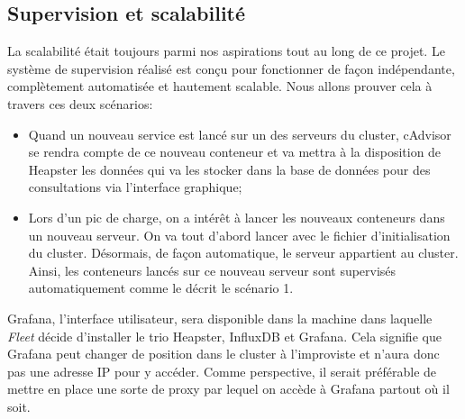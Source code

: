 \begin{onehalfspace}
\subsection{Supervision et scalabilité}

La scalabilité était toujours parmi nos aspirations tout au long de ce projet. Le système de supervision réalisé est conçu pour fonctionner de façon indépendante, complètement automatisée et hautement scalable. Nous allons prouver cela à travers ces deux scénarios:

\begin{itemize}
	\item Quand un nouveau service est lancé sur un des serveurs du cluster, cAdvisor se rendra compte de ce nouveau conteneur et va mettra à la disposition de Heapster les données qui va les stocker dans la base de données pour des consultations via l'interface graphique;
	\item Lors d'un pic de charge, on a intérêt à lancer les nouveaux conteneurs dans un nouveau serveur. On va tout d'abord lancer avec le fichier d'initialisation du cluster. Désormais, de façon automatique, le serveur appartient au cluster. Ainsi, les conteneurs lancés sur ce nouveau serveur sont supervisés automatiquement comme le décrit le scénario 1.
\end{itemize}

Grafana, l'interface utilisateur, sera disponible dans la machine dans laquelle \emph{Fleet} décide d'installer le trio Heapster, InfluxDB et Grafana. Cela signifie que Grafana peut changer de position dans le cluster à l'improviste et n'aura donc pas une adresse IP pour y accéder. Comme perspective, il serait préférable de mettre en place une sorte de proxy par lequel on accède à Grafana partout où il soit.



\end{onehalfspace}
